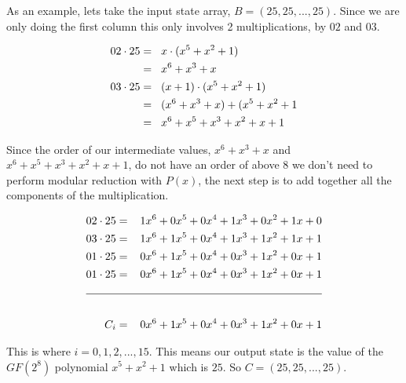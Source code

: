 As an example, lets take the input state array, $B = (25,25,...,25)$. Since we are only doing the first column this only involves 2 multiplications, by $02$ and $03$. 

\vspace{-1cm}
\begin{center}
\begin{align*}
02 \cdot 25 =& \hspace{0.3cm} x \cdot (x^5 + x^2 + 1) \\
            =& \hspace{0.3cm} x^6 + x^3 + x \\
03 \cdot 25 =& \hspace{0.3cm} (x + 1) \cdot (x^5 + x^2 + 1) \\
            =& \hspace{0.3cm} (x^6 + x^3 + x) + (x^5 + x^2 + 1 \\
            =& \hspace{0.3cm} x^6 + x^5 + x^3 + x^2 + x + 1
\end{align*}
\end{center}

Since the order of our intermediate values, $x^6 + x^3 + x$ and $x^6 + x^5 + x^3 + x^2 + x + 1$, do not have an order of above $8$ we don't need to perform modular reduction with $P(x)$, the next step is to add together all the components of the multiplication.

\vspace{-1cm}
\begin{center}
\begin{align*}
02 \cdot 25 &= \hspace{0.3cm} 1x^6 + 0x^5 + 0x^4 + 1x^3 + 0x^2 + 1x + 0 \\
03 \cdot 25 &= \hspace{0.3cm} 1x^6 + 1x^5 + 0x^4 + 1x^3 + 1x^2 + 1x + 1 \\
01 \cdot 25 &= \hspace{0.3cm} 0x^6 + 1x^5 + 0x^4 + 0x^3 + 1x^2 + 0x + 1 \\
01 \cdot 25 &= \hspace{0.3cm} 0x^6 + 1x^5 + 0x^4 + 0x^3 + 1x^2 + 0x + 1 \\
\cline{1-2} \\
C_i &= \hspace{0.3cm} 0x^6 + 1x^5 + 0x^4 + 0x^3 + 1x^2 + 0x + 1
\end{align*}
\end{center}

This is where $i = 0,1,2,...,15$. This means our output state is the value of the $GF(2^8)$ polynomial $x^5 + x^2 + 1$ which is $25$. So $C = (25,25,...,25)$. 
 
